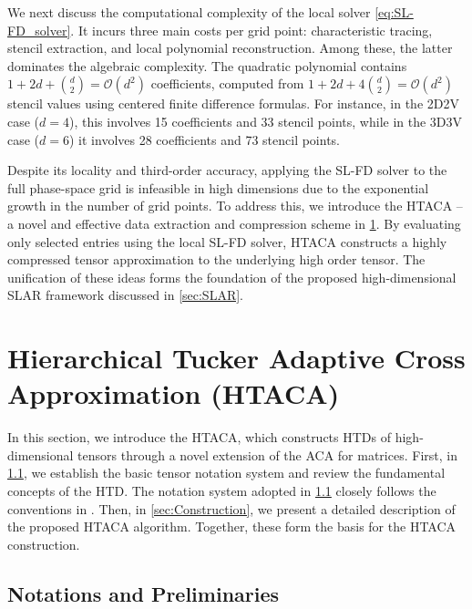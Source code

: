 \documentclass{article}
\theoremstyle{plain}
\theoremstyle{definition}
\theoremstyle{remark}
\begin{document}
We next discuss the computational complexity of the local solver \eqref{eq:SL-FD_solver}. It incurs three main costs per grid point: characteristic tracing, stencil extraction, and local polynomial reconstruction. Among these, the latter dominates the algebraic complexity. The quadratic polynomial contains \(1 + 2d + \binom{d}{2} = \mathcal{O}(d^2)\) coefficients, computed from \(1 + 2d + 4\binom{d}{2} = \mathcal{O}(d^2)\) stencil values using centered finite difference formulas. For instance, in the 2D2V case (\(d=4\)), this involves 15 coefficients and 33 stencil points, while in the 3D3V case (\(d=6\)) it involves 28 coefficients and 73 stencil points.

Despite its locality and third-order accuracy, applying the SL-FD solver to the full phase-space grid is infeasible in high dimensions due to the exponential growth in the number of grid points. To address this, we introduce the HTACA -- a novel and effective data extraction and compression scheme in \cref{sec:HTACA}. By evaluating only selected entries using the local SL-FD solver, HTACA constructs a highly compressed tensor approximation to the underlying high order tensor. The unification of these ideas forms the foundation of the proposed high-dimensional SLAR framework discussed in \cref{sec:SLAR}.



\section{Hierarchical Tucker Adaptive Cross Approximation (HTACA)}
\label{sec:HTACA}

In this section, we introduce the HTACA, which constructs HTDs of high-dimensional tensors through a novel extension of the ACA for matrices. First, in \cref{sec:Preliminaries}, we establish the basic tensor notation system and review the fundamental concepts of the HTD. The notation system adopted in \cref{sec:Preliminaries} closely follows the conventions in \cite{grasedyck2010hierarchical,kressner2012htucker}. Then, in \cref{sec:Construction}, we present a detailed description of the proposed HTACA algorithm. Together, these form the basis for the HTACA construction.

\subsection{{Notations and} Preliminaries}\label{sec:Preliminaries}
\end{document}
